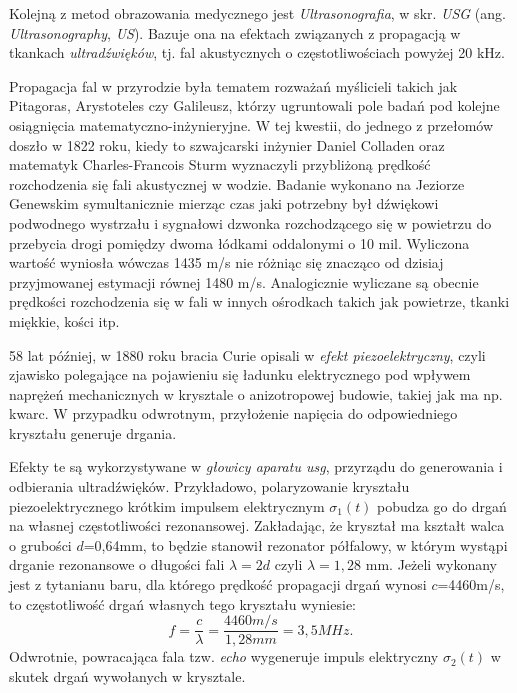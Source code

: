 Kolejną z metod obrazowania medycznego jest \textit{Ultrasonografia}, w skr. \textit{USG} (ang. \textit{Ultrasonography}, \textit{US}). Bazuje ona na efektach związanych z propagacją w tkankach \textit{ultradźwięków}, tj. fal akustycznych o częstotliwościach powyżej 20 kHz.

Propagacja fal w przyrodzie była tematem rozważań myślicieli takich jak Pitagoras, Arystoteles czy Galileusz, którzy ugruntowali pole badań pod kolejne osiągnięcia matematyczno-inżynieryjne. W tej kwestii, do jednego z przełomów doszło w 1822 roku, kiedy to szwajcarski inżynier Daniel Colladen oraz matematyk Charles-Francois Sturm wyznaczyli przybliżoną prędkość rozchodzenia się fali akustycznej w wodzie. Badanie wykonano na Jeziorze Genewskim symultanicznie mierząc czas jaki potrzebny był dźwiękowi podwodnego wystrzału i sygnałowi dzwonka rozchodzącego się w powietrzu do przebycia drogi pomiędzy dwoma łódkami oddalonymi o 10 mil. Wyliczona wartość wyniosła wówczas 1435 m/s nie różniąc się znacząco od dzisiaj przyjmowanej estymacji równej 1480 m/s. Analogicznie wyliczane są obecnie prędkości rozchodzenia się w fali w innych ośrodkach takich jak powietrze, tkanki miękkie, kości itp.

58 lat później, w 1880 roku bracia Curie opisali w \cite{Curie1880} \textit{efekt piezoelektryczny}, czyli zjawisko polegające na pojawieniu się ładunku elektrycznego pod wpływem naprężeń mechanicznych w krysztale o anizotropowej budowie, takiej jak ma np. kwarc. W przypadku odwrotnym, przyłożenie napięcia do odpowiedniego kryształu generuje drgania. 

Efekty te są wykorzystywane w \textit{głowicy aparatu usg}, przyrządu do generowania i odbierania ultradźwięków. Przykładowo, polaryzowanie kryształu piezoelektrycznego krótkim impulsem elektrycznym $\sigma_1(t)$ pobudza go do drgań na własnej częstotliwości rezonansowej. Zakładając, że kryształ ma kształt walca o grubości $d$=0,64mm, to będzie stanowił rezonator półfalowy, w którym wystąpi drganie rezonansowe o długości fali $\lambda = 2d$ czyli $\lambda = 1,28$ mm. Jeżeli wykonany jest z tytanianu baru, dla którego prędkość propagacji drgań wynosi $c$=4460m/s, to częstotliwość drgań własnych tego
kryształu wyniesie:
\begin{equation}
f = \frac{c}{\lambda} = \frac{4460 m/s}{1,28 mm} = 3,5 MHz.
\end{equation}
Odwrotnie, powracająca fala tzw. \textit{echo} wygeneruje impuls elektryczny $\sigma_2(t)$ w skutek drgań wywołanych w krysztale. 
 
